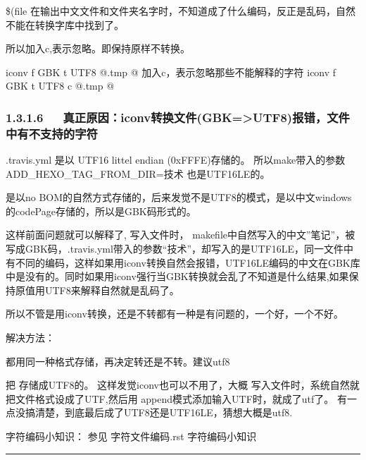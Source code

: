\documentclass[letterpaper,12pt,english]{sphinxmanual}
\begin{document}
\$(file 在输出中文文件和文件夹名字时，不知道成了什么编码，反正是乱码，自然不能在转换字库中找到了。

所以加入\sphinxhyphen{}c,表示忽略。即保持原样不转换。

\begin{sphinxVerbatim}[commandchars=\\\{\}]
\PYGZsh{}   iconv \PYGZhy{}f GBK \PYGZhy{}t UTF\PYGZhy{}8 \PYGZdl{}\PYGZdl{}@.tmp \PYGZgt{}\PYGZdl{}\PYGZdl{}@
\PYGZsh{} 加入\PYGZhy{}c，表示忽略那些不能解释的字符
    iconv \PYGZhy{}f GBK \PYGZhy{}t UTF\PYGZhy{}8 \PYGZhy{}c \PYGZdl{}\PYGZdl{}@.tmp \PYGZgt{}\PYGZdl{}\PYGZdl{}@
\end{sphinxVerbatim}


\subsubsection{1.3.1.6   真正原因：iconv转换文件(GBK=>UTF8)报错，文件中有不支持的字符}
\label{\detokenize{001software/001install/001._u7f51_u7ad9/travisCI:id4}}
.travis.yml 是以 UTF\sphinxhyphen{}16 littel endian (0xFFFE)存储的。 所以make带入的参数 ADD\_HEXO\_TAG\_FROM\_DIR=技术 也是UTF16LE的。

 是以no BOM的自然方式存储的，后来发觉不是UTF8的模式，是以中文windows的codePage存储的，所以是GBK码形式的。

这样前面问题就可以解释了,   写入文件时， makefile中自然写入的中文”笔记”，被写成GBK码，.travis.yml带入的参数“技术”，却写入的是UTF16LE，同一文件中有不同的编码，这样如果用iconv转换自然会报错，UTF16LE编码的中文在GBK库中是没有的。同时如果用iconv强行当GBK转换就会乱了不知道是什么结果,如果保持原值用UTF8来解释自然就是乱码了。

所以不管是用iconv转换，还是不转都有一种是有问题的，一个好，一个不好。

解决方法：

都用同一种格式存储，再决定转还是不转。建议utf8

把  存储成UTF8的。
这样发觉iconv也可以不用了，大概  写入文件时，系统自然就把文件格式设成了UTF,然后用  append模式添加输入UTF时，就成了utf了。 有一点没搞清楚，到底最后成了UTF8还是UTF16LE，猜想大概是utf8.

字符编码小知识： 参见 字符文件编码.rst 字符编码小知识


\bigskip\hrule\bigskip
\end{document}
